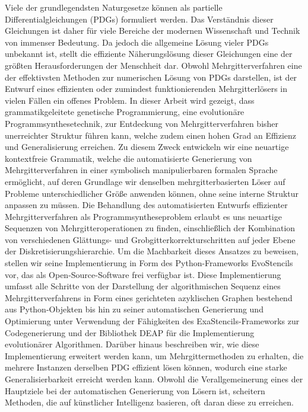 Viele der grundlegendsten Naturgesetze können als partielle Differentialgleichungen (PDGs) formuliert werden. 
Das Verständnis dieser Gleichungen ist daher für viele Bereiche der modernen Wissenschaft und Technik von immenser Bedeutung. 
Da jedoch die allgemeine Lösung vieler PDGs unbekannt ist, stellt die effiziente Näherungslösung dieser Gleichungen eine der größten Herausforderungen der Menschheit dar.
Obwohl Mehrgitterverfahren eine der effektivsten Methoden zur numerischen Lösung von PDGs darstellen, ist der Entwurf eines effizienten oder zumindest funktionierenden Mehrgitterlösers in vielen Fällen ein offenes Problem.
In dieser Arbeit wird gezeigt, dass grammatikgeleitete genetische Programmierung, eine evolutionäre Programmsynthesetechnik, zur Entdeckung von Mehrgitterverfahren bisher unerreichter Struktur führen kann, welche zudem einen hohen Grad an Effizienz und Generalisierung erreichen.
Zu diesem Zweck entwickeln wir eine neuartige kontextfreie Grammatik, welche die automatisierte Generierung von Mehrgitterverfahren in einer symbolisch manipulierbaren formalen Sprache ermöglicht, auf deren Grundlage wir denselben mehrgitterbasierten Löser auf Probleme unterschiedlicher Größe anwenden können, ohne seine interne Struktur anpassen zu müssen.
Die Behandlung des automatisierten Entwurfs effizienter Mehrgitterverfahren als Programmsyntheseproblem erlaubt es uns neuartige Sequenzen von Mehrgitteroperationen zu finden, einschließlich der Kombination von verschiedenen Glättungs- und Grobgitterkorrekturschritten auf jeder Ebene der Diskretisierungshierarchie.
Um die Machbarkeit dieses Ansatzes zu beweisen, stellen wir seine Implementierung in Form des Python-Frameworks EvoStencils vor, das als Open-Source-Software frei verfügbar ist.
Diese Implementierung umfasst alle Schritte von der Darstellung der algorithmischen Sequenz eines Mehrgitterverfahrens in Form eines gerichteten azyklischen Graphen bestehend aus Python-Objekten bis hin zu seiner automatischen Generierung und Optimierung unter Verwendung der Fähigkeiten des ExaStencils-Frameworks zur Codegenerierung und der Bibliothek DEAP für die Implementierung evolutionärer Algorithmen.
Darüber hinaus beschreiben wir, wie diese Implementierung erweitert werden kann, um Mehrgittermethoden zu erhalten, die mehrere Instanzen derselben PDG effizient lösen können, wodurch eine starke Generalisierbarkeit erreicht werden kann.
Obwohl die Verallgemeinerung eines der Hauptziele bei der automatischen Generierung von Lösern ist, scheitern Methoden, die auf künstlicher Intelligenz basieren, oft daran diese zu erreichen. 
